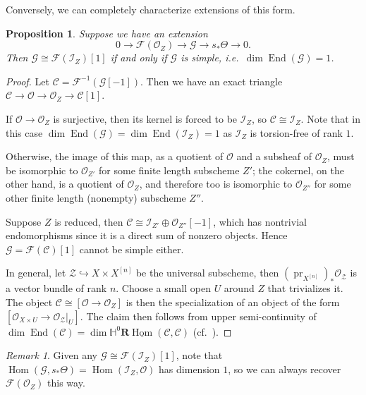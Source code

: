 \documentclass{amsart}
\theoremstyle{plain}
\newtheorem{proposition}[theorem]{Proposition}
\theoremstyle{definition}
\theoremstyle{remark}
\newtheorem{remark}[theorem]{Remark}
\begin{document}
    Conversely, we can completely characterize extensions of this form.
    \begin{proposition}\label{ext2_checkhilb}
        Suppose we have an extension
        \[0\to \mathcal F(\mathcal O_Z)\to \mathcal G\to s_\ast\Theta\to 0.\]
        Then $\mathcal G\cong\mathcal F(\mathcal I_Z)[1]$ if and only if $\mathcal G$ is simple, i.e.~$\dim\operatorname{End}(\mathcal G)=1$.
    \end{proposition}
    \begin{proof}
        Let $\mathcal C=\mathcal F^{-1}(\mathcal G[-1])$.
        Then we have an exact triangle $\mathcal C\to \mathcal O\to\mathcal O_Z\to\mathcal C[1]$.

        If $\mathcal O\to \mathcal O_Z$ is surjective, then its kernel is forced to be $\mathcal I_Z$, so $\mathcal C\cong\mathcal I_Z$.
        Note that in this case $\dim\operatorname{End}(\mathcal G)=\dim\operatorname{End}(\mathcal I_Z)=1$ as $\mathcal I_Z$ is torsion-free of rank $1$.

        Otherwise, the image of this map, as a quotient of $\mathcal O$ and a subsheaf of $\mathcal O_Z$, must be isomorphic to $\mathcal O_{Z'}$ for some finite length subscheme $Z'$; the cokernel, on the other hand, is a quotient of $\mathcal O_Z$, and therefore too is isomorphic to $\mathcal O_{Z''}$ for some other finite length (nonempty) subscheme $Z''$.

        Suppose $Z$ is reduced, then $\mathcal C\cong\mathcal I_{Z'}\oplus\mathcal O_{Z''}[-1]$, which has nontrivial endomorphisms since it is a direct sum of nonzero objects.
        Hence $\mathcal G=\mathcal F(\mathcal C)[1]$ cannot be simple either.

        In general, let $\mathcal Z\hookrightarrow X\times X^{[n]}$ be the universal subscheme, then $(\operatorname{pr}_{X^{[n]}})_\ast\mathcal O_{\mathcal Z}$ is a vector bundle of rank $n$.
        Choose a small open $U$ around $Z$ that trivializes it.
        The object $\mathcal C\cong[\mathcal O\to\mathcal O_Z]$ is then the specialization of an object of the form $[\mathcal O_{X\times U}\to \mathcal O_{\mathcal Z}|_U]$.
        The claim then follows from upper semi-continuity of $\dim\operatorname{End}(\mathcal C)=\dim\mathbb H^0\mathbf R\underline{\operatorname{Hom}}(\mathcal C,\mathcal C)$ (cf.~\cite[Proposition 6.4]{semicont}).
    \end{proof}
    \begin{remark}
        Given any $\mathcal G\cong\mathcal F(\mathcal I_Z)[1]$, note that $\operatorname{Hom}(\mathcal G,s_\ast\Theta)=\operatorname{Hom}(\mathcal I_Z,\mathcal O)$ has dimension $1$, so we can always recover $\mathcal F(\mathcal O_Z)$ this way.
    \end{remark}
\end{document}
